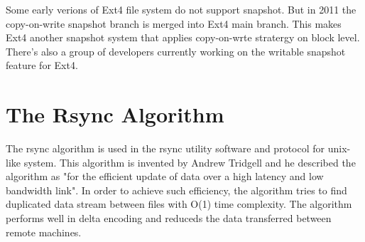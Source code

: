     Some early verions of Ext4 file system do not support snapshot. But in 2011 the copy-on-write snapshot branch is merged into Ext4 main branch. This makes Ext4 another snapshot system that applies copy-on-wrte stratergy on block level. There's also a group of developers currently working on the writable snapshot feature for Ext4.

\section{The Rsync Algorithm}
    
    The rsync algorithm is used in the rsync utility software and protocol for unix-like system. This algorithm is invented by Andrew Tridgell and he described the algorithm as "for the efficient update of data over a high latency and low bandwidth link". In order to achieve such efficiency, the algorithm tries to find duplicated data stream between files with O(1) time complexity. The algorithm performs well in delta encoding and reduceds the data transferred between remote machines.
